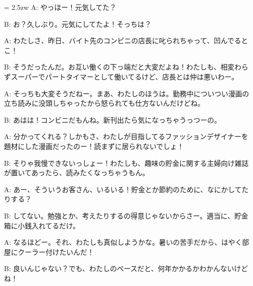 \documentclass[11pt]{amsart}
\title{}
\author{}
\newenvironment{hangall}[1]{\hangindent = 2.5zw\everypar{\hangindent = 2.5zw}}{}
\begin{document}
\maketitle
\begin{hangall}{}%
A: やっほー！元気してた？

B: お？久しぶり。元気にしてたよ！そっちは？

A: わたしさ、昨日、バイト先のコンビニの店長に叱られちゃって、凹んでるとこ！

B: そうだったんだ。お互い働くの下っ端だと大変だよね！わたしも、相変わらずスーパーでパートタイマーとして働いてるけど、店長とは仲は悪いわー。

A: そっちも大変そうだねー。まあ、わたしのほうは。勤務中についつい漫画の立ち読みに没頭しちゃったから怒られても仕方ないんだけどね。

B: あはは！コンビニだもんね。新刊出たら気になっちゃうっつーの。

A: 分かってくれる？しかもさ、わたしが目指してるファッションデザイナーを題材にした漫画だったのー！読まずに居られないでしょ！

B: そりゃ我慢できないっしょー！わたしも、趣味の貯金に関する主婦向け雑誌が置いてあったら、読みたくなっちゃうもん。

A: あー、そういうお客さん、いるいる！貯金とか節約のために、なにかしてたりする？

B: してない。勉強とか、考えたりするの得意じゃないからさー。適当に、貯金箱に小銭入れてるだけ。

A: なるほどー。それ、わたしも真似しようかな。暑いの苦手だから、はやく部屋にクーラー付けたいんだ！

B: 良いんじゃない？でも、わたしのペースだと、何年かかるかわかんないけどね！
\end{hangall}
\end{document}
